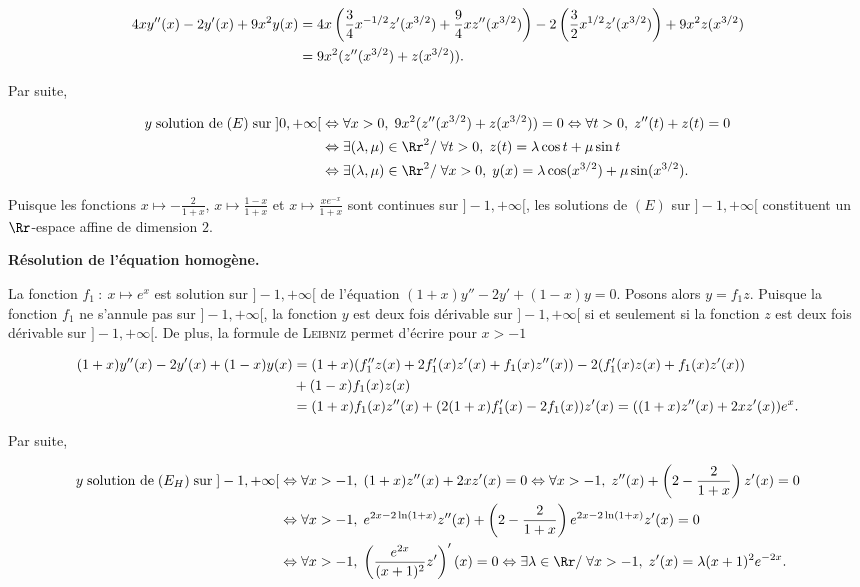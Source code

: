 {\begin{enumerate}
{\begin{align*}\ensuremath
4xy''(x)- 2y'(x)+ 9x^2y(x)&=4x\left( \frac{3}{4}x^{-1/2}z'(x^{3/2})+ \frac{9}{4}xz''(x^{3/2})\right)-2\left( \frac{3}{2}x^{1/2}z'(x^{3/2})\right)+9x^2z(x^{3/2})\\
 &=9x^2(z''(x^{3/2})+z(x^{3/2})).
\end{align*}

Par suite,

\begin{align*}\ensuremath
y\;\text{solution de}\;(E)\;\text{sur}\;]0,+\infty[&\Leftrightarrow\forall x>0,\;9x^2(z''(x^{3/2})+z(x^{3/2}))=0\Leftrightarrow\forall t>0,\;z''(t)+z(t)=0\\
 &\Leftrightarrow\exists(\lambda,\mu)\in\Rr^2/\;\forall t>0,\;z(t)=\lambda\cos t+\mu\sin t\\
 &\Leftrightarrow\exists(\lambda,\mu)\in\Rr^2/\;\forall x>0,\;y(x)=\lambda\cos(x^{3/2})+\mu\sin(x^{3/2}).
\end{align*}

\begin{center}
\fbox{
$\mathcal{S}_{]0,+\infty[}=\left\{x\mapsto\lambda\cos(x^{3/2})+\mu\sin(x^{3/2}),\;(\lambda,\mu)\in\Rr^2\right\}$.
}
\end{center}
Puisque les fonctions $x\mapsto- \frac{2}{1+x}$, $x\mapsto \frac{1-x}{1+x}$ et $x\mapsto \frac{xe^{-x}}{1+x}$ sont continues sur $]-1,+\infty[$, les solutions de $(E)$ sur $]-1,+\infty[$ constituent un $\Rr$-espace affine de dimension $2$.

\textbf{Résolution de l'équation homogène.} 

La fonction $f_1~:~x\mapsto e^x$ est solution sur $]-1,+\infty[$ de l'équation $(1+x)y''-2y'+(1-x)y=0$. Posons alors $y=f_1z$. Puisque la fonction $f_1$ ne s'annule pas sur $]-1,+\infty[$, la fonction $y$ est deux fois dérivable sur $]-1,+\infty[$ si et seulement si la fonction $z$ est deux fois dérivable sur $]-1,+\infty[$. De plus, la formule de \textsc{Leibniz} permet d'écrire pour $x>-1$

\begin{align*}\ensuremath
(1+x)y''(x)-2y'(x)+(1-x)y(x)&=(1+x)(f_1''z(x)+2f_1'(x)z'(x)+f_1(x)z''(x))-2(f_1'(x)z(x)+f_1(x)z'(x))\\
 &+(1-x)f_1(x)z(x)\\
 &=(1+x)f_1(x)z''(x)+(2(1+x)f_1'(x)-2f_1(x))z'(x)=((1+x)z''(x)+2xz'(x))e^x.
\end{align*}

Par suite,

\begin{align*}\ensuremath
y\;\text{solution de}\;(E_H)\;\text{sur}\;]-1,+\infty[&\Leftrightarrow\forall x>-1,\;(1+x)z''(x)+2xz'(x)=0\Leftrightarrow\forall x>-1,\;z''(x)+\left(2- \frac{2}{1+x}\right)z'(x)=0\\
 &\Leftrightarrow\forall x>-1,\;e^{2x-2\ln(1+x)}z''(x)+\left(2- \frac{2}{1+x}\right)e^{2x-2\ln(1+x)}z'(x)=0\\
 &\Leftrightarrow\forall x>-1,\;\left( \frac{e^{2x}}{(x+1)^2}z'\right)'(x)=0\Leftrightarrow\exists\lambda\in\Rr/\;\forall x>-1,\;z'(x)=\lambda(x+1)^2e^{-2x}.
\end{align*}

}
\end{enumerate}}
